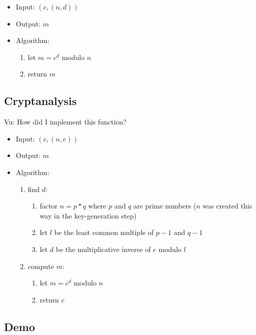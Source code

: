 \begin{itemize}
\item Input: $(c, (n, d))$
\item Output: $m$
\item Algorithm:
  \begin{enumerate}
  \item let $m = c^d$ modulo $n$
  \item return $m$
  \end{enumerate}
\end{itemize}


\subsection{Cryptanalysis}

Vu:
How did I implement this function?

\begin{itemize}
\item Input: $(c, (n, e))$
\item Output: $m$
\item Algorithm:
  \begin{enumerate}
  \item find $d$:
    \begin{enumerate}
    \item factor $n = p * q$ where
      $p$ and $q$ are prime numbers
      ($n$ was created this way in the key-generation step)
    \item let $l$ be the least common multiple of
      $p - 1$ and $q - 1$
    \item let $d$ be the multiplicative inverse of $e$
      modulo $l$
    \end{enumerate}
  \item compute $m$:
    \begin{enumerate}
    \item let $m = c^d$ modulo $n$
    \item return $c$
    \end{enumerate}
  \end{enumerate}
\end{itemize}


\subsection{Demo}

\codes{}
